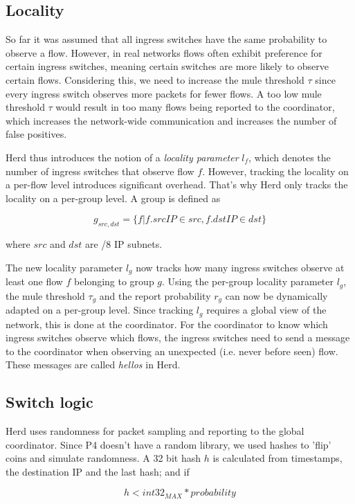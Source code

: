 \documentclass[11pt,oneside,a4paper]{article}
\begin{document}
\subsection{Locality} \label{locality}
So far it was assumed that all ingress switches have the same probability to observe a flow. However, in real networks flows often exhibit preference for certain ingress switches, meaning certain switches are more likely to observe certain flows. Considering this, we need to increase the mule threshold $\tau$ since every ingress switch observes more packets for fewer flows. A too low mule threshold $\tau$ would result in too many flows being reported to the coordinator, which increases the network-wide communication and increases the number of false positives.

\noindent Herd thus introduces the notion of a \textit{locality parameter} $l_f$, which denotes the number of ingress switches that observe flow $f$. However, tracking the locality on a per-flow level introduces significant overhead. That's why Herd only tracks the locality on a per-group level. A group is defined as

$$g_{src,dst} = \{f | f.srcIP \in src, f.dstIP \in dst\}$$

\noindent where $src$ and $dst$ are /8 IP subnets.

\noindent The new locality parameter $l_g$ now tracks how many ingress switches observe at least one flow $f$ belonging to group $g$. Using the per-group locality parameter $l_g$, the mule threshold $\tau_g$ and the report probability $r_g$ can now be dynamically adapted on a per-group level. Since tracking $l_g$ requires a global view of the network, this is done at the coordinator. For the coordinator to know which ingress switches observe which flows, the ingress switches need to send a message to the coordinator when observing an unexpected (i.e. never before seen) flow. These messages are called \textit{hellos} in Herd.


\subsection{Switch logic} \label{switch}
Herd uses randomness for packet sampling and reporting to the global coordinator. Since P4 doesn't have a random library, we used hashes to 'flip' coins and simulate randomness.
\noindent A  32 bit hash $h$ is calculated from timestamps, the destination IP and the last hash; and if

$$h < int32_{MAX} * probability$$
\end{document}
